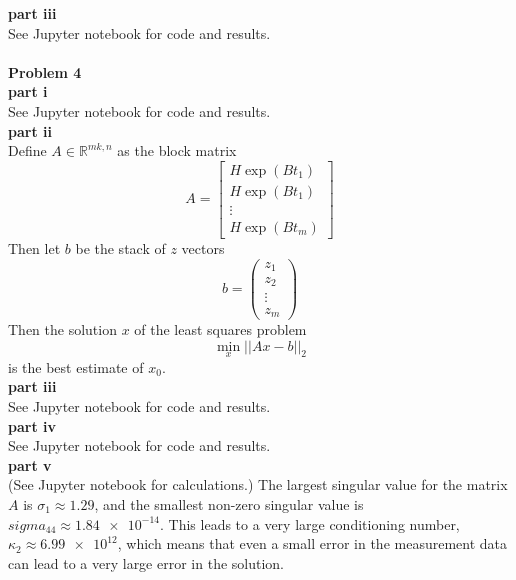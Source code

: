 \documentclass{article} %
\begin{document}
\textbf{part iii} \\
See Jupyter notebook for code and results. \\
\\


\textbf{Problem 4} \\
\textbf{part i} \\
See Jupyter notebook for code and results.
\\

\textbf{part ii} \\
Define $A \in \mathbb{R}^{mk, n}$ as the block matrix
\begin{equation*}
A = \begin{bmatrix} H \exp(Bt_1) \\ H \exp(Bt_1) \\ \vdots \\ H \exp(Bt_m)\end{bmatrix} 
\end{equation*}
Then let $b$ be the stack of $z$ vectors
\begin{equation*}
b =  \begin{pmatrix} z_1 \\ z_2 \\ \vdots \\ z_m \end{pmatrix}
\end{equation*}
Then the solution $x$ of the least squares problem 
\begin{equation*}
\min_x ||Ax-b||_2
\end{equation*}
is the best estimate of $x_0$.
\\

\textbf{part iii} \\
See Jupyter notebook for code and results.
\\

\textbf{part iv} \\
See Jupyter notebook for code and results.
\\

\textbf{part v} \\
(See Jupyter notebook for calculations.)  The largest singular value for the matrix $A$ is $\sigma_1 \approx 1.29$, and the smallest non-zero singular value is $sigma_{44} \approx \num{1.84e-14}$.  This leads to a very large conditioning number, $\kappa_2 \approx \num{6.99e12}$, which means that even a small error in the measurement data can lead to a very large error in the solution.    
\\
\end{document}
